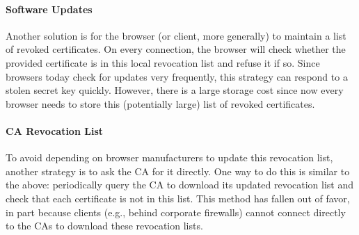 \paragraph{Software Updates}
Another solution is for the browser (or client, more generally)
to maintain a list of revoked certificates.
On every connection, the browser will check whether the provided certificate is in this local revocation list and refuse it if so.
Since browsers today check for updates very frequently, this strategy can respond to a stolen secret key quickly. However, there is a large storage cost since now every browser needs to store this (potentially large) list of revoked certificates.

\paragraph{CA Revocation List}
To avoid depending on browser manufacturers to update this revocation list, another strategy is to ask the CA for it directly. One way to do this is similar to the above: periodically query the CA to download its updated revocation list and check that each certificate is not in this list. This method has fallen out of favor, in part because clients (e.g., behind corporate firewalls) cannot connect directly to the CAs to download these revocation lists.

